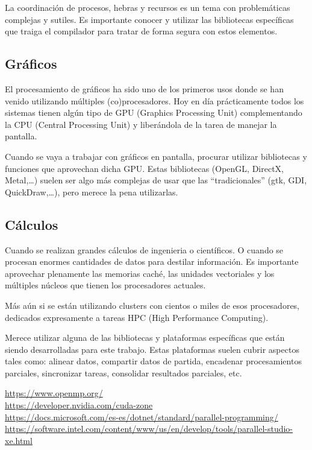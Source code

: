 \documentclass[spanish,12pt,a4paper,final,oneside]{book}
\begin{document}
La coordinación de procesos, hebras y recursos es un tema con problemáticas complejas y sutiles. Es importante conocer y utilizar las bibliotecas específicas que traiga el compilador para tratar de forma segura con estos elementos.

\subsection{Gráficos}
El procesamiento de gráficos ha sido uno de los primeros usos donde se han venido utilizando múltiples (co)procesadores. Hoy en día prácticamente todos los sistemas tienen algún tipo de GPU (Graphics Processing Unit) complementando la CPU (Central Processing Unit) y liberándola de la tarea de manejar la pantalla. 

Cuando se vaya a trabajar con gráficos en pantalla, procurar utilizar bibliotecas y funciones que aprovechan dicha GPU. Estas bibliotecas (OpenGL, DirectX, Metal,\ldots) suelen ser algo más complejas de usar que las ``tradicionales'' (gtk, GDI, QuickDraw,\ldots), pero merece la pena utilizarlas.


\subsection{Cálculos}
Cuando se realizan grandes cálculos de ingenieria o científicos. O cuando se procesan enormes cantidades de datos para destilar información. Es importante aprovechar plenamente las memorias caché, las unidades vectoriales y los múltiples núcleos que tienen los procesadores actuales. 

Más aún si se están utilizando clusters con cientos o miles de esos procesadores, dedicados expresamente a tareas HPC (High Performance Computing). 

Merece utilizar alguna de las bibliotecas y plataformas específicas que están siendo desarrolladas para este trabajo. Estas plataformas suelen cubrir aspectos tales como: alinear datos, compartir datos de partida, encadenar procesamientos parciales, sincronizar tareas, consolidar resultados parciales, etc.

\url{https://www.openmp.org/}
\\ \url{https://developer.nvidia.com/cuda-zone}
\\ \url{https://docs.microsoft.com/es-es/dotnet/standard/parallel-programming/}
\\ \url{https://software.intel.com/content/www/us/en/develop/tools/parallel-studio-xe.html}
\end{document}
